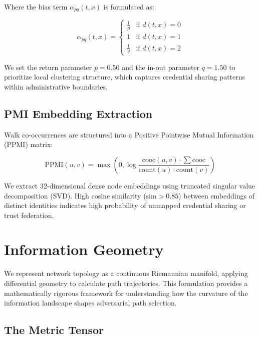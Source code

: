 \documentclass[11pt,a4paper]{article}
\theoremstyle{definition}
\numberwithin{equation}{section}
\begin{document}
Where the bias term $\alpha_{pq}(t, x)$ is formulated as:

\begin{equation}\label{eq:bias}
\alpha_{pq}(t, x) = \begin{cases} \frac{1}{p} & \text{if } d(t, x) = 0 \\ 1 & \text{if } d(t, x) = 1 \\ \frac{1}{q} & \text{if } d(t, x) = 2 \end{cases}
\end{equation}

We set the return parameter $p = 0.50$ and the in-out parameter $q = 1.50$ to prioritize local clustering structure, which captures credential sharing patterns within administrative boundaries.

\subsection{PMI Embedding Extraction}\label{subsec:pmi}

Walk co-occurrences are structured into a Positive Pointwise Mutual Information (PPMI) matrix:

\begin{equation}\label{eq:ppmi}
\text{PPMI}(u,v) = \max \left( 0, \log \frac{\text{cooc}(u,v) \cdot \sum \text{cooc}}{\text{count}(u) \cdot \text{count}(v)} \right)
\end{equation}

We extract $32$-dimensional dense node embeddings using truncated singular value decomposition (SVD). High cosine similarity ($\text{sim} > 0.85$) between embeddings of distinct identities indicates high probability of unmapped credential sharing or trust federation.

\section{Information Geometry}\label{sec:geometry}

We represent network topology as a continuous Riemannian manifold, applying differential geometry to calculate path trajectories. This formulation provides a mathematically rigorous framework for understanding how the curvature of the information landscape shapes adversarial path selection.

\subsection{The Metric Tensor}\label{subsec:metric}
\end{document}
